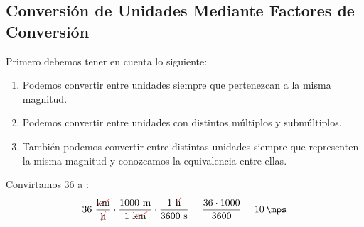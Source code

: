 
\subsection{Conversión de Unidades Mediante Factores de Conversión}

Primero debemos tener en cuenta lo siguiente:
\begin{enumerate}[label=\letraminuscula]
        \item Podemos convertir entre unidades siempre que pertenezcan a la misma magnitud.
        \item Podemos convertir entre unidades con distintos múltiplos y submúltiplos.
        \item También podemos convertir entre distintas unidades siempre que representen la misma magnitud y conozcamos la equivalencia entre ellas.
\end{enumerate}

\begin{example}
    Convirtamos \qty{36}{\kmph} a \unit{\mps}:
    \begin{equation*}
        36\ \dfrac{\cancelred{\unit{\kilo\metre}}}{\cancel{\unit{\hour}}} \cdot \dfrac{1000\ \unit{\metre}}{1\ \cancelred{\unit{\kilo\metre}}} \cdot \dfrac{1\ \cancelred{\unit{\hour}}}{3600\ \unit{\second}} = \dfrac{36 \cdot 1000}{3600} = \qty{10}{\mps}
    \end{equation*}
\end{example}

